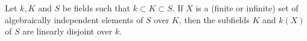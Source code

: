 Let $k, K$ and $S$ be fields such that $k \subset K \subset S$. If $X$ is a (finite or infinite) set of algebraically independent elements of $S$ over $K$, then the subfields $K$ and $k(X)$ of $S$ are linearly disjoint over $k$.
